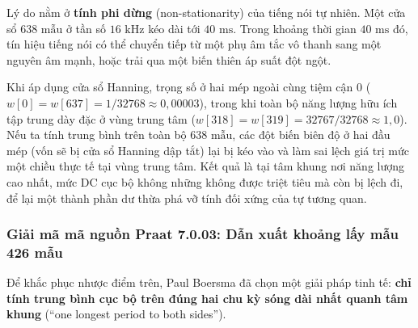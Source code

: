 Lý do nằm ở \textbf{tính phi dừng} (non-stationarity) của tiếng nói tự nhiên. Một cửa sổ $638\text{ mẫu}$ ở tần số $16\text{ kHz}$ kéo dài tới $40\text{ ms}$. Trong khoảng thời gian $40\text{ ms}$ đó, tín hiệu tiếng nói có thể chuyển tiếp từ một phụ âm tắc vô thanh sang một nguyên âm mạnh, hoặc trải qua một biến thiên áp suất đột ngột. 

Khi áp dụng cửa sổ Hanning, trọng số ở hai mép ngoài cùng tiệm cận $0$ ($w[0] = w[637] = 1/32768 \approx 0{,}00003$), trong khi toàn bộ năng lượng hữu ích tập trung dày đặc ở vùng trung tâm ($w[318] = w[319] = 32767/32768 \approx 1{,}0$). Nếu ta tính trung bình trên toàn bộ $638\text{ mẫu}$, các đột biến biên độ ở hai đầu mép (vốn sẽ bị cửa sổ Hanning dập tắt) lại bị kéo vào và làm sai lệch giá trị mức một chiều thực tế tại vùng trung tâm. Kết quả là tại tâm khung nơi năng lượng cao nhất, mức DC cục bộ không những không được triệt tiêu mà còn bị lệch đi, để lại một thành phần dư thừa phá vỡ tính đối xứng của tự tương quan.

\subsubsection*{Giải mã mã nguồn Praat 7.0.03: Dẫn xuất khoảng lấy mẫu 426 mẫu}
Để khắc phục nhược điểm trên, Paul Boersma đã chọn một giải pháp tinh tế: \textbf{chỉ tính trung bình cục bộ trên đúng hai chu kỳ sóng dài nhất quanh tâm khung} (``one longest period to both sides''). 

